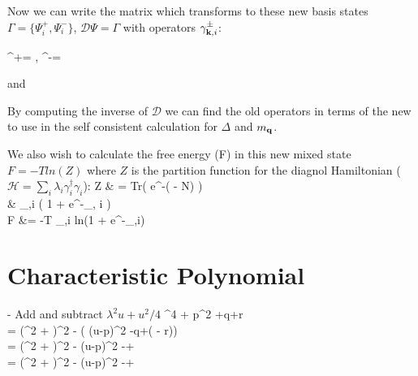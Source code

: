 \documentclass[aps,prl,twocolumn,showpacs,amsmath,amssymb]{revtex4-1}
\begin{document}
Now we can write the matrix which transforms to these new basis states $\Gamma = \{\Psi_i^+, \Psi_i^-\}$,  $\mathcal{D}\Psi = \Gamma$ with operators $\gamma^{\pm}_{{\bf k}, i}$:


\bea
{}^+=  \quad,\quad\quad\quad
{}^-= 
\eea

\bea
\eea
and
\bea
{}
\eea


By computing the inverse of $\mathcal{D}$ we can find the old operators in terms of the new to use in the self consistent calculation for $\Delta$ and $m_{\bf q}$.



We also wish to calculate the free energy (F) in this new mixed state $F= -T ln(Z)$ where $Z$ is the partition function for the diagnol Hamiltonian ($\mathcal{H} = \sum\limits_{i} \lambda_i \gamma^\dagger_i\gamma_i$):
\bea
Z &    = Tr\bigg( e^{-\beta( - \mu N)} \bigg) \\
	 & \Pi_{\vk,i} \bigg(  1 +  e^{-\beta\lambda_{\vk, i}} \bigg) \\
F &= -T \sum\limits_{\vk,i} ln\big(1 + e^{-\beta\lambda_{\vk,i}}\big)
\eea



\section{Characteristic Polynomial}
 - Add and subtract $\lambda^2 u + u^2/4$
 \bea
 \lambda^4 + p\lambda^2 +q\lambda+r \\
 = (\lambda^2 + )^2 - ( (u-p)\lambda^2 -q\lambda +( - r)) \\
 = (\lambda^2 + )^2 - (u-p)\bigg{(}\lambda^2 -\lambda +\bigg{)} \\
  = (\lambda^2 + )^2 - (u-p)\bigg{(}\lambda^2 -\lambda +\bigg{)} 
 \eea
 
\end{document}
